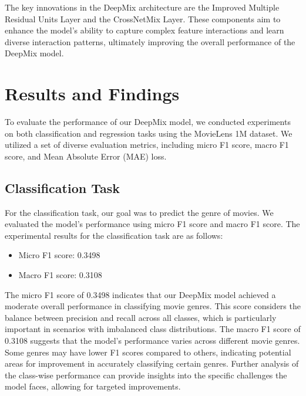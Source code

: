\documentclass{sigkddExp}
\begin{document}
The key innovations in the DeepMix architecture are the Improved Multiple Residual Units Layer and the CrossNetMix Layer. These components aim to enhance the model's ability to capture complex feature interactions and learn diverse interaction patterns, ultimately improving the overall performance of the DeepMix model.

% 
%   
\section{Results and Findings}
\vspace{3mm}
To evaluate the performance of our DeepMix model, we conducted experiments on both classification and regression tasks using the MovieLens 1M dataset. We utilized a set of diverse evaluation metrics, including micro F1 score, macro F1 score, and Mean Absolute Error (MAE) loss.

\subsection{Classification Task}
\vspace{3mm}
For the classification task, our goal was to predict the genre of movies. We evaluated the model's performance using micro F1 score and macro F1 score.
\vspace{3mm}\newline
The experimental results for the classification task are as follows:

\begin{itemize}
\item Micro F1 score: 0.3498
\item Macro F1 score: 0.3108
\end{itemize}

The micro F1 score of 0.3498 indicates that our DeepMix model achieved a moderate overall performance in classifying movie genres. This score considers the balance between precision and recall across all classes, which is particularly important in scenarios with imbalanced class distributions.
\vspace{3mm}\newline
The macro F1 score of 0.3108 suggests that the model's performance varies across different movie genres. Some genres may have lower F1 scores compared to others, indicating potential areas for improvement in accurately classifying certain genres. Further analysis of the class-wise performance can provide insights into the specific challenges the model faces, allowing for targeted improvements.
\end{document}
